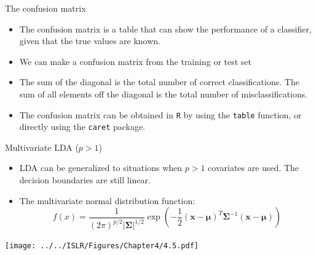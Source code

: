 \documentclass[
  10pt,
  ignorenonframetext,
]{beamer}
\providecommand{\tightlist}{%
  \setlength{\itemsep}{0pt}\setlength{\parskip}{0pt}}
\begin{document}
\begin{frame}[fragile]
\begin{block}{The confusion matrix}
\protect\hypertarget{the-confusion-matrix}{}
\(~\)

\begin{itemize}
\tightlist
\item
  The confusion matrix is a table that can show the performance of a
  classifier, given that the true values are known.
\end{itemize}

\vspace{2mm}

\begin{itemize}
\tightlist
\item
  We can make a confusion matrix from the training or test set
\end{itemize}

\vspace{2mm}

\begin{itemize}
\tightlist
\item
  The sum of the diagonal is the total number of correct
  classifications. The sum of all elements off the diagonal is the total
  number of misclassifications.
\end{itemize}

\centering

\vspace{2mm}
\flushleft

\begin{itemize}
\tightlist
\item
  The confusion matrix can be obtained in \texttt{R} by using the
  \texttt{table} function, or directly using the \texttt{caret} package.
\end{itemize}
\end{block}
\end{frame}

\begin{frame}{Multivariate LDA (\(p>1\))}
\protect\hypertarget{multivariate-lda-p1}{}
\vspace{2mm}

\begin{itemize}
\item
  LDA can be generalized to situations when \(p>1\) covariates are used.
  The decision boundaries are still linear.
\item
  The multivariate normal distribution function:
  \[f(x) = \frac{1}{(2 \pi)^{p/2}|\boldsymbol{\Sigma}|^{1/2}}\exp({-\frac{1}{2}({\boldsymbol x}-\boldsymbol\mu)^T \boldsymbol{\Sigma}^{-1}({\boldsymbol x}-\boldsymbol\mu)})\]
\end{itemize}

\centering

\texttt{[image: ../../ISLR/Figures/Chapter4/4.5.pdf]}
\end{frame}
\end{document}
